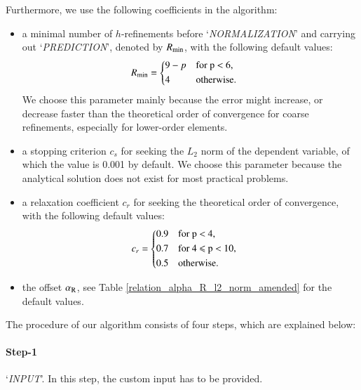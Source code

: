 \documentclass[review,3p]{elsarticle}
\begin{document}
Furthermore, we use the following coefficients in the algorithm:		%
\begin{itemize}
  \renewcommand\labelitemi{--}
  \item a minimal number of $h$-refinements before `\textit{NORMALIZATION}' and carrying out `\textit{PREDICTION}', denoted by $R_{\rm min}$, with the following default values:
  \begin{equation}
  \begin{aligned}
      R_{\rm min} &=
      \begin{cases*}
	9-p & for p $<$ 6, \\
	4 & otherwise.
      \end{cases*}
  \end{aligned}
  \end{equation} 
  We choose this parameter mainly because the error might increase, or decrease faster than the theoretical order of convergence for coarse refinements, especially for lower-order elements.
  \item a stopping criterion $c_s$ for seeking the $L_2$ norm of the dependent variable, of which the value is 0.001 by default. We choose this parameter because the analytical solution does not exist for most practical problems.
  \item a relaxation coefficient $c_r$ for seeking the theoretical order of convergence, with the following default values: 
    \begin{equation}
    \begin{aligned}
	c_r &=
	\begin{cases*}
	  0.9 & for p $<$ 4, \\
	  0.7 & for 4 $\leqslant$ p $<$ 10, \\
	  0.5 & otherwise.
	\end{cases*}
    \end{aligned}
    \end{equation}
  \item the offset $\alpha _{\rm R}$, see Table \ref{relation_alpha_R_l2_norm_amended} for the default values.
\end{itemize}

The procedure of our algorithm consists of four steps, which are explained below:

\paragraph{Step-1} `\textit{INPUT}'. In this step, the custom input has to be provided.
\end{document}
